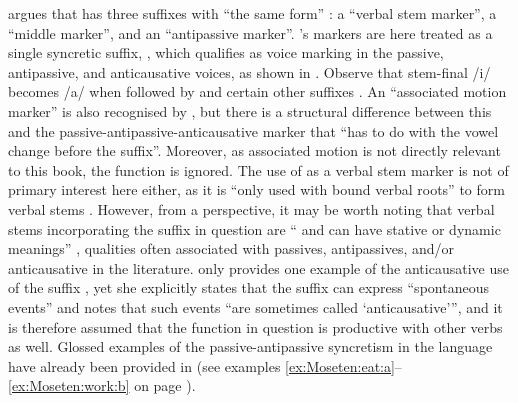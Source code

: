 \citet[236, 306ff.]{sakel:2004} argues that  has three suffixes with “the same form” : a “verbal stem marker”, a “middle marker”, and an “antipassive marker”. \citeauthor{sakel:2004}’s markers are here treated as a single syncretic suffix, , which qualifies as voice marking in the passive, antipassive, and anticausative voices, as shown in . Observe that stem-final /i/ becomes /a/ when followed by  and certain other suffixes \citep[47, 308]{sakel:2004}. An “associated motion marker”  is also recognised by \citet[273]{sakel:2004}, but there is a structural difference between this and the passive-antipassive-anticausative marker  that “has to do with the vowel change before the suffix”. Moreover, as associated motion is not directly relevant to this book, the function is ignored. The use of  as a verbal stem marker is not of primary interest here either, as it is “only used with bound verbal roots” to form verbal stems \citep[218, 236]{sakel:2004}. However, from a  perspective, it may be worth noting that verbal stems incorporating the suffix in question are “ and can have stative or dynamic meanings” \citep[236]{sakel:2004}, qualities often associated with passives, antipassives, and/or anticausative in the literature. \citet[307, 479]{sakel:2004} only provides one example of the anticausative use of the suffix , yet she explicitly states that the suffix can express “spontaneous events” and notes that such events “are sometimes called ‘anticausative’”, and it is therefore assumed that the function in question is productive with other verbs as well. Glossed examples of the passive-antipassive syncretism in the language have already been provided in  (see examples \ref{ex:Moseten:eat:a}--\ref{ex:Moseten:work:b} on page \pageref{ex:Moseten:eat:a}).

